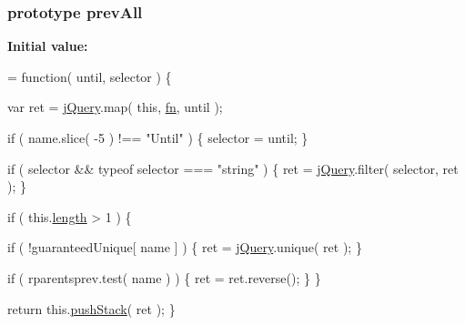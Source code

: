 \subsubsection[{prev\+All}]{ {\bf prototype} prev\+All}\label{jquery-1_810_82-vsdoc_8js_a919573a4164877583504b17f0594a6a1}
{\bfseries Initial value\+:}
\begin{DoxyCode}
= \textcolor{keyword}{function}( until, selector ) \{


        var ret = \hyperlink{jquery-1_810_82-vsdoc_8js_add5237586d970a38a81f990e8eb28c6c}{jQuery}.map( \textcolor{keyword}{this}, \hyperlink{jquery-1_810_82-vsdoc_8js_acef6bdaf6b9b20fdcca1ea86f0902c3b}{fn}, until );

        \textcolor{keywordflow}{if} ( name.slice( -5 ) !== \textcolor{stringliteral}{"Until"} ) \{
            selector = until;
        \}

        \textcolor{keywordflow}{if} ( selector && typeof selector === \textcolor{stringliteral}{"string"} ) \{
            ret = \hyperlink{jquery-1_810_82-vsdoc_8js_add5237586d970a38a81f990e8eb28c6c}{jQuery}.filter( selector, ret );
        \}

        \textcolor{keywordflow}{if} ( this.\hyperlink{jquery-1_810_82-vsdoc_8js_aa7de35d58da66d9944ab9cbe82c19640}{length} > 1 ) \{
            
            \textcolor{keywordflow}{if} ( !guaranteedUnique[ name ] ) \{
                ret = \hyperlink{jquery-1_810_82-vsdoc_8js_add5237586d970a38a81f990e8eb28c6c}{jQuery}.unique( ret );
            \}

            
            \textcolor{keywordflow}{if} ( rparentsprev.test( name ) ) \{
                ret = ret.reverse();
            \}
        \}

        \textcolor{keywordflow}{return} this.\hyperlink{jquery-1_810_82-vsdoc_8js_afc3a7db1ef2b526338c06c07cecccd44}{pushStack}( ret );
    \}
\end{DoxyCode}
\hypertarget{jquery-1_810_82-vsdoc_8js_aafc4d39414b638f56c88573e5f8b4fb4}{}
